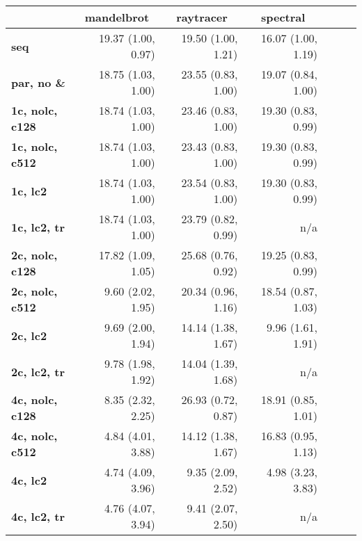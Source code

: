 {\small
\begin{tabular}{|l|r|r|r|r|r|r|}
\hline
& \multicolumn{1}{|c|}{\textbf{mandelbrot}}
& \multicolumn{1}{|c|}{\textbf{raytracer}}
& \multicolumn{1}{|c|}{\textbf{spectral}}
\\
\hline
\textbf{                           seq}  & 19.37 (1.00, 0.97) & 19.50 (1.00, 1.21) & 16.07 (1.00, 1.19)\\
\textbf{                    par, no \&}  & 18.75 (1.03, 1.00) & 23.55 (0.83, 1.00) & 19.07 (0.84, 1.00)\\
\hline
\textbf{                1c, nolc, c128}  & 18.74 (1.03, 1.00) & 23.46 (0.83, 1.00) & 19.30 (0.83, 0.99)\\
\textbf{                1c, nolc, c512}  & 18.74 (1.03, 1.00) & 23.43 (0.83, 1.00) & 19.30 (0.83, 0.99)\\
\textbf{                       1c, lc2}  & 18.74 (1.03, 1.00) & 23.54 (0.83, 1.00) & 19.30 (0.83, 0.99)\\
\textbf{                   1c, lc2, tr}  & 18.74 (1.03, 1.00) & 23.79 (0.82, 0.99) & n/a \\
\hline
\textbf{                2c, nolc, c128}  & 17.82 (1.09, 1.05) & 25.68 (0.76, 0.92) & 19.25 (0.83, 0.99)\\
\textbf{                2c, nolc, c512}  &  9.60 (2.02, 1.95) & 20.34 (0.96, 1.16) & 18.54 (0.87, 1.03)\\
\textbf{                       2c, lc2}  &  9.69 (2.00, 1.94) & 14.14 (1.38, 1.67) &  9.96 (1.61, 1.91)\\
\textbf{                   2c, lc2, tr}  &  9.78 (1.98, 1.92) & 14.04 (1.39, 1.68) & n/a \\
\hline
\textbf{                4c, nolc, c128}  &  8.35 (2.32, 2.25) & 26.93 (0.72, 0.87) & 18.91 (0.85, 1.01)\\
\textbf{                4c, nolc, c512}  &  4.84 (4.01, 3.88) & 14.12 (1.38, 1.67) & 16.83 (0.95, 1.13)\\
\textbf{                       4c, lc2}  &  4.74 (4.09, 3.96) &  9.35 (2.09, 2.52) &  4.98 (3.23, 3.83)\\
\textbf{                   4c, lc2, tr}  &  4.76 (4.07, 3.94) &  9.41 (2.07, 2.50) & n/a \\
\hline
\end{tabular}
}
